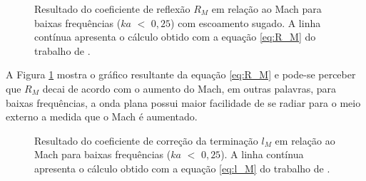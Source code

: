 \begin{figure}[h!]
\centering
  \caption[Coeficiente de reflexão $R_{M}$ com escoamento sugado]{Resultado do coeficiente de reflexão $R_{M}$ em relação ao Mach para baixas frequências ($ka$ $<$ $0,25$) com escoamento sugado. A linha contínua apresenta o cálculo obtido com a equação \ref{eq:R_M} do trabalho de .}
  \label{fig:comp3}
\end{figure}

A Figura \ref{fig:comp3} mostra o gráfico resultante da equação \ref{eq:R_M} e pode-se perceber que $R_{M}$ decai de acordo com o aumento do Mach, em outras palavras, para baixas frequências, a onda plana possui maior facilidade de se radiar para o meio externo a medida que o Mach é aumentado. 


\begin{figure}[h!]
\centering
  \caption[Coeficiente de correção da terminação $l_{M}$]{Resultado do coeficiente de correção da terminação $l_{M}$ em relação ao Mach para baixas frequências ($ka$ $<$ $0,25$). A linha contínua apresenta o cálculo obtido com a equação \ref{eq:l_M} do trabalho de .}
  \label{fig:comp4}
\end{figure}


